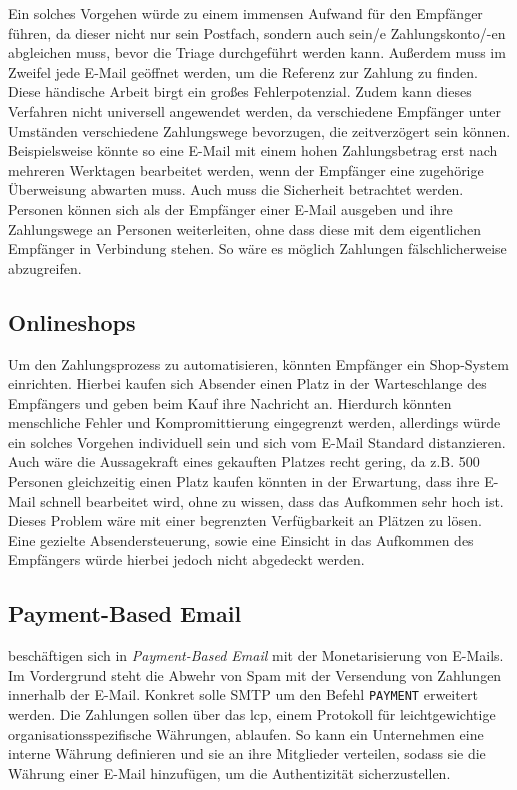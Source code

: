 Ein solches Vorgehen würde zu einem immensen Aufwand für den Empfänger führen, da dieser nicht nur sein Postfach, sondern auch sein/e Zahlungskonto/-en abgleichen muss, bevor die Triage durchgeführt werden kann. Außerdem muss im Zweifel jede E-Mail geöffnet werden, um die Referenz zur Zahlung zu finden. Diese händische Arbeit birgt ein großes Fehlerpotenzial. Zudem kann dieses Verfahren nicht universell angewendet werden, da verschiedene Empfänger unter Umständen verschiedene Zahlungswege bevorzugen, die zeitverzögert sein können. Beispielsweise könnte so eine E-Mail mit einem hohen Zahlungsbetrag erst nach mehreren Werktagen bearbeitet werden, wenn der Empfänger eine zugehörige Überweisung abwarten muss. Auch muss die Sicherheit betrachtet werden. Personen können sich als der Empfänger einer E-Mail ausgeben und ihre Zahlungswege an Personen weiterleiten, ohne dass diese mit dem eigentlichen Empfänger in Verbindung stehen. So wäre es möglich Zahlungen fälschlicherweise abzugreifen.

\subsection{Onlineshops}
Um den Zahlungsprozess zu automatisieren, könnten Empfänger ein Shop-System einrichten. Hierbei kaufen sich Absender einen Platz in der Warteschlange des Empfängers und geben beim Kauf ihre Nachricht an. Hierdurch könnten menschliche Fehler und Kompromittierung eingegrenzt werden, allerdings würde ein solches Vorgehen individuell sein und sich vom E-Mail Standard distanzieren. Auch wäre die Aussagekraft eines gekauften Platzes recht gering, da z.B. 500 Personen gleichzeitig einen Platz kaufen könnten in der Erwartung, dass ihre E-Mail schnell bearbeitet wird, ohne zu wissen, dass das Aufkommen sehr hoch ist. Dieses Problem wäre mit einer begrenzten Verfügbarkeit an Plätzen zu lösen. Eine gezielte Absendersteuerung, sowie eine Einsicht in das Aufkommen des Empfängers würde hierbei jedoch nicht abgedeckt werden.

\subsection{Payment-Based Email}
\label{Payment-Based_Email}
\cite{Turner2003} beschäftigen sich in \textit{Payment-Based Email} mit der Monetarisierung von E-Mails. Im Vordergrund steht die Abwehr von Spam mit der Versendung von Zahlungen innerhalb der E-Mail. Konkret solle SMTP um den Befehl \texttt{PAYMENT} erweitert werden. Die Zahlungen sollen über das \acrfull{lcp}, einem Protokoll für leichtgewichtige organisationsspezifische Währungen, ablaufen. So kann ein Unternehmen eine interne Währung definieren und sie an ihre Mitglieder verteilen, sodass sie die Währung einer E-Mail hinzufügen, um die Authentizität sicherzustellen.


